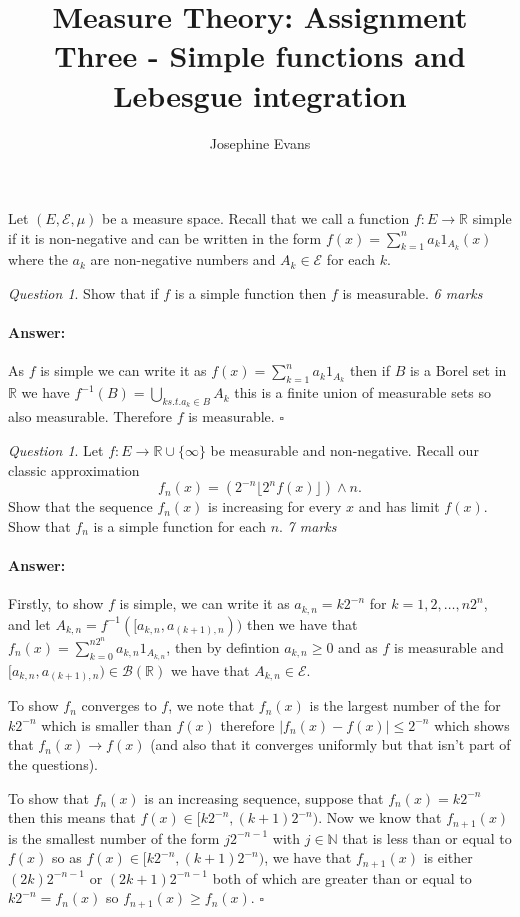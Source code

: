 \documentclass[11pt]{article}
\author{
Josephine Evans
}
\title{Measure Theory: Assignment Three - Simple functions and Lebesgue integration}
\theoremstyle{definition}
\theoremstyle{remark}
\newtheorem{q}[thm]{Question}
\newenvironment{ans}{\paragraph{Answer:}}{\hfill$\square$ \vspace{10pt}}
\begin{document}
\maketitle



Let $(E, \mathcal{E}, \mu)$ be a measure space. Recall that we call a function $f: E \rightarrow \mathbb{R}$ simple if it is non-negative and can be written in the form $f(x) = \sum_{k=1}^n a_k1_{A_k}(x)$ where the $a_k$ are non-negative numbers and $A_k \in \mathcal{E}$ for each $k$.

\begin{q}
Show that if $f$ is a simple function then $f$ is measurable. \emph{6 marks}
\end{q}
\begin{ans}
As $f$ is simple we can write it as $f(x) = \sum_{k=1}^n a_k 1_{A_k}$ then if $B$ is a Borel set in $\mathbb{R}$ we have $f^{-1}(B) = \bigcup_{k s.t. a_k \in B}A_k$ this is a finite union of measurable sets so also measurable. Therefore $f$ is measurable.
\end{ans}

\begin{q}
Let $f: E \rightarrow \mathbb{R}\cup\{\infty\}$ be measurable and non-negative. Recall our classic approximation
\[ f_n(x) = \left(2^{-n} \lfloor 2^n f(x) \rfloor \right)\wedge n. \] Show that the sequence $f_n(x)$ is increasing for every $x$ and has limit $f(x)$. Show that $f_n$ is a simple function for each $n$.  \emph{7 marks}
\end{q}
\begin{ans}
Firstly, to show $f$ is simple, we can write it as $a_{k,n} = k2^{-n}$ for $k =1,2, \dots, n2^n$, and let $A_{k,n} = f^{-1}([a_{k,n}, a_{(k+1),n}))$ then we have that $f_n(x) = \sum_{k=0}^{n2^n} a_{k,n}1_{A_{k,n}}$, then by defintion $a_{k,n} \geq 0$ and as $f$ is measurable and $[a_{k,n}, a_{(k+1),n}) \in \mathcal{B}(\mathbb{R})$ we have that $A_{k,n} \in \mathcal{E}$.

To show $f_n$ converges to $f$, we note that $f_n(x)$ is the largest number of the for $k2^{-n}$ which is smaller than $f(x)$ therefore $|f_n(x)-f(x)| \leq 2^{-n}$ which shows that $f_n(x) \rightarrow f(x)$ (and also that it converges uniformly but that isn't part of the questions). 

To show that $f_n(x)$ is an increasing sequence, suppose that $f_n(x) = k2^{-n}$ then this means that $f(x) \in [k2^{-n}, (k+1)2^{-n})$. Now we know that $f_{n+1}(x)$ is the smallest number of the form $j2^{-n-1}$ with $j \in \mathbb{N}$ that is less than or equal to $f(x)$ so as $f(x) \in [k2^{-n}, (k+1)2^{-n})$, we have that $f_{n+1}(x)$ is either $(2k)2^{-n-1}$ or $(2k+1)2^{-n-1}$ both of which are greater than or equal to $k2^{-n} = f_n(x)$ so $f_{n+1}(x) \geq f_n(x)$.
\end{ans}
\end{document}
